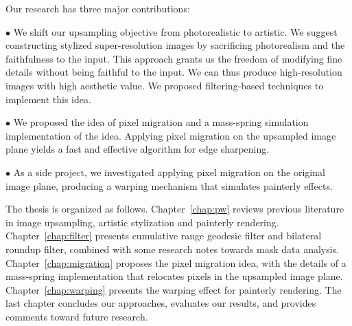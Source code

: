 Our research has three major contributions:

$\bullet$ We shift our upsampling objective from photorealistic to artistic. We suggest constructing stylized super-resolution images by sacrificing photorealism and the faithfulness to the input. This approach grants us the freedom of modifying fine details without being faithful to the input. We can thus produce high-resolution images with high aesthetic value. We proposed filtering-based techniques to implement this idea.

$\bullet$ We proposed the idea of pixel migration and a mass-spring simulation implementation of the idea. Applying pixel migration on the upsampled image plane yields a fast and effective algorithm for edge sharpening. 

$\bullet$ As a side project, we investigated applying pixel migration on the original image plane, producing a warping mechanism that simulates painterly effects. 

The thesis is organized as follows. Chapter~\ref {chap:pw} reviews previous literature in image upsampling, artistic stylization and painterly rendering. Chapter~\ref {chap:filter} presents cumulative range geodesic filter and bilateral roundup filter, combined with some research notes towards mask data analysis. Chapter~\ref {chap:migration} proposes the pixel migration idea, with the details of a mass-spring implementation that relocates pixels in the upsampled image plane. Chapter~\ref {chap:warping} presents the warping effect for painterly rendering. The last chapter concludes our approaches, evaluates our results, and provides comments toward future research.
